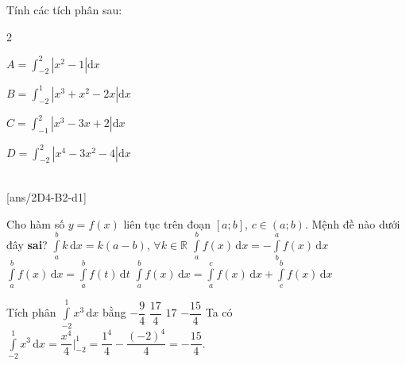 \begin{vd}
	Tính các tích phân sau:
	\begin{enumEX}[a)]{2}
		\item $A=\displaystyle\int_{-2}^2\left|x^2-1\right| \mathrm{d} x$
		\item $B=\displaystyle\int_{-2}^1\left|x^3+x^2-2 x\right| \mathrm{d} x$
		\item $C=\displaystyle\int_{-1}^2\left|x^3-3 x+2\right| \mathrm{d} x$
		\item $D=\displaystyle\int_{-2}^2\left|x^4-3 x^2-4\right| \mathrm{d} x$
	\end{enumEX}
\end{vd}
 \\
\setcounter{ex}{0}
[ans/2D4-B2-d1]

\begin{ex}
	Cho hàm số $y=f(x)$ liên tục trên đoạn $[a;b]$, $c\in (a;b)$. Mệnh đề nào dưới đây \textbf{sai}?
	\haicot
	{\True $\displaystyle\int\limits_a^b k \mathrm{\,d}x=k(a-b)$, $\forall k\in \mathbb{R}$}
	{$\displaystyle\int\limits_a^b f(x) \mathrm{\,d}x=-\displaystyle\int\limits_b^a f(x) \mathrm{\,d}x$}
	{$\displaystyle\int\limits_a^b f(x) \mathrm{\,d}x=\displaystyle\int\limits_a^b f(t) \mathrm{\,d}t$}
	{$\displaystyle\int\limits_a^b f(x) \mathrm{\,d}x=\displaystyle\int\limits_a^c f(x) \mathrm{\,d}x+\displaystyle\int\limits_c^b f(x) \mathrm{\,d}x$}
\end{ex}

\begin{ex}%
	Tích phân $\displaystyle\int\limits_{-2}^1 x^3\mathrm{\,d}x$ bằng
	\choice
	{$-\dfrac{9}{4}$}
	{$\dfrac{17}{4}$}
	{$17$}
	{\True $-\dfrac{15}{4}$}
	\loigiai
	{
		Ta có $\displaystyle\int\limits_{-2}^1 x^3\mathrm{\,d}x = \dfrac{x^4}{4}\bigg|_{-2}^1 = \dfrac{1^4}{4}-\dfrac{(-2)^4}{4} = -\dfrac{15}{4}$.
	}
\end{ex}


